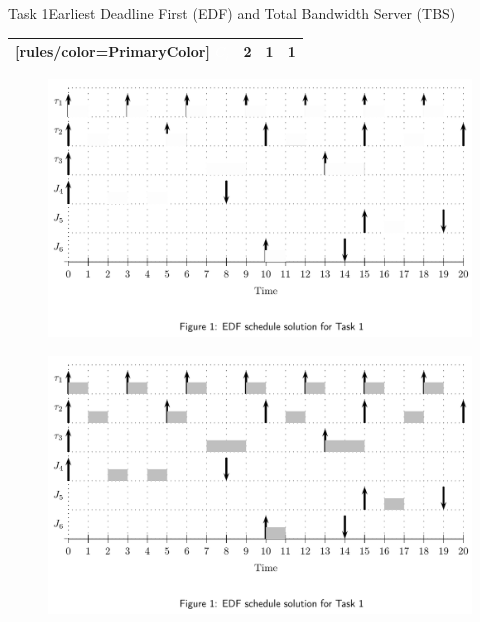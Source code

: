 \begin{frame}[allowframebreaks]{Task 1}{Earliest Deadline First (EDF) and Total Bandwidth Server (TBS)}
\begin{solution}
\begin{NiceTabular}{X[1,c]X[2,c]X[2,c]X[2,c]}[rules/color=PrimaryColor]
        \textcolor{white}{$C_i$} & 2 & 1 & 1 \\
        \bottomrule
      \end{NiceTabular}
  \end{solution}
    \begin{figure}
        \centering
        \includegraphics[height=0.6\paperheight]{./figures/1_sol_empty.png}
    \end{figure}
    \begin{figure}
      \centering
      \includegraphics[height=0.6\paperheight]{./figures/1_sol.png}
    \end{figure}
\end{frame}
